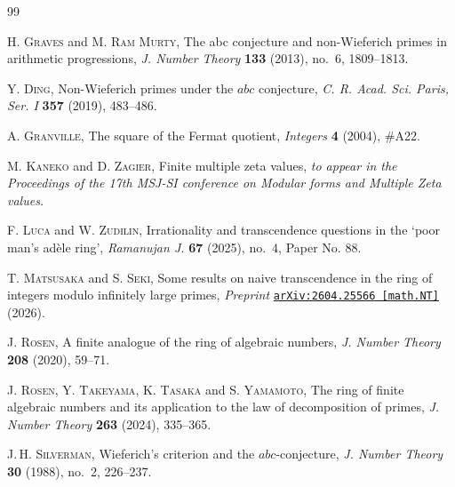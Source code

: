 \documentclass[12pt,reqno]{amsart}
\theoremstyle{remark}
\begin{document}
\begin{thebibliography}{99}


\textsc{H. Graves} and \textsc{M. Ram Murty},
The abc conjecture and non-{W}ieferich primes in arithmetic progressions,
\emph{J. Number Theory} \textbf{133} (2013), no.~6, 1809--1813.

\textsc{Y. Ding},
Non-{W}ieferich primes under the $abc$ conjecture,
\emph{C. R. Acad. Sci. Paris, Ser. I} \textbf{357} (2019), 483--486.

\textsc{A. Granville},
The square of the Fermat quotient,
\emph{Integers} \textbf{4} (2004), \#A22.

\textsc{M. Kaneko} and \textsc{D. Zagier},
Finite multiple zeta values, 
\emph{to appear in the Proceedings of the 17th MSJ-SI conference on Modular forms and Multiple Zeta values.}

\textsc{F. Luca} and \textsc{W. Zudilin},
Irrationality and transcendence questions in the `poor man's ad\`ele ring',
\emph{Ramanujan J.} \textbf{67} (2025), no.~4, Paper No. 88.

\textsc{T. Matsusaka} and \textsc{S. Seki},
Some results on naive transcendence in the ring of integers modulo infinitely large primes, 
\emph{Preprint} \href{https://arxiv.org/abs/2604.25566}{\texttt{arXiv:2604.25566 [math.NT]}} (2026).

\textsc{J. Rosen},
A finite analogue of the ring of algebraic numbers,
\emph{J. Number Theory} \textbf{208} (2020), 59--71.

\textsc{J. Rosen}, \textsc{Y. Takeyama}, \textsc{K. Tasaka} and \textsc{S. Yamamoto},
The ring of finite algebraic numbers and its application to the law of decomposition of primes,
\emph{J. Number Theory} \textbf{263} (2024), 335--365.

\textsc{J.\,H. Silverman},
Wieferich's criterion and the $abc$-conjecture,
\emph{J. Number Theory} \textbf{30} (1988), no.~2, 226–237. 

\end{thebibliography}
\end{document}
